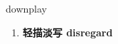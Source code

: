 
\begin{frame}
{\huge downplay}
\begin{center}
\begin{enumerate}\Large
  \item \textbf{轻描淡写 disregard}
\end{enumerate}
\end{center}
\end{frame}
